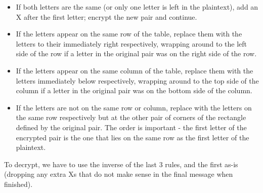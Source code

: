 \documentclass[Lau,binding=0.6cm,oneside]{sapthesis}
\begin{document}
\begin{itemize}
	\item If both letters are the same (or only one letter is left in the plaintext), add an X after the first letter; encrypt the new pair and continue.
	\item If the letters appear on the same row of the table, replace them with the letters to their immediately right respectively, wrapping around to the left side of the row if a letter in the original pair was on the right side of the row.
	\item If the letters appear on the same column of the table, replace them with the letters immediately below respectively, wrapping around to the top side of the column if a letter in the original pair was on the bottom side of the column.
	\item If the letters are not on the same row or column, replace with the letters on the same row respectively but at the other pair of corners of the rectangle defined by the original pair. The order is important - the first letter of the encrypted pair is the one that lies on the same row as the first letter of the plaintext.
\end{itemize}

To decrypt, we have to use the inverse of the last 3 rules, and the first as-is (dropping any extra Xs that do not make sense in the final message when finished).\\\\
\end{document}
